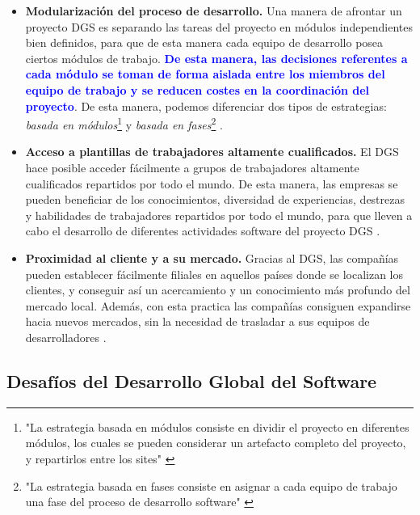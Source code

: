 \begin{itemize}
	\item \textbf{Modularización del proceso de desarrollo.} Una manera de afrontar un proyecto DGS es separando las tareas del proyecto en módulos independientes bien definidos, para que de esta manera cada equipo de desarrollo posea ciertos módulos de trabajo. \textbf{\textcolor{blue}{De esta manera, las decisiones referentes a cada módulo se toman de forma aislada entre los miembros del equipo de trabajo y se reducen costes en la coordinación del proyecto}}. De esta manera, podemos diferenciar dos tipos de estrategias: \emph{basada en módulos}\footnote{"La estrategia basada en módulos consiste en dividir el proyecto en diferentes módulos, los cuales se pueden considerar un artefacto completo del proyecto, y repartirlos entre los sites" \cite{piattini2014desarrollo}} y \emph{basada en fases}\footnote{"La estrategia basada en fases consiste en asignar a cada equipo de trabajo una fase del proceso de desarrollo software" \cite{piattini2014desarrollo}} \cite{conchuir2006exploring, conchuir2009global, aagerfalk2008benefits}.
	
	\item \textbf{Acceso a plantillas de trabajadores altamente cualificados.} El DGS hace posible acceder fácilmente a grupos de trabajadores altamente cualificados repartidos por todo el mundo. De esta manera, las empresas se pueden beneficiar de los conocimientos, diversidad de experiencias, destrezas y habilidades de trabajadores repartidos por todo el mundo, para que lleven a cabo el desarrollo de diferentes actividades software del proyecto DGS \cite{vizcaino2015vision, conchuir2006exploring, conchuir2009global, aagerfalk2008benefits}.
	
	\item \textbf{Proximidad al cliente y a su mercado.} Gracias al DGS, las compañías pueden establecer fácilmente filiales en aquellos países donde se localizan los clientes, y conseguir así un acercamiento y un conocimiento más profundo del mercado local. Además, con esta practica las compañías consiguen expandirse hacia nuevos mercados, sin la necesidad de trasladar a sus equipos de desarrolladores \cite{vizcaino2015vision, conchuir2006exploring, conchuir2009global, aagerfalk2008benefits}.
\end{itemize}

\subsection{Desafíos del Desarrollo Global del Software}
\label{sec:Desafios}

